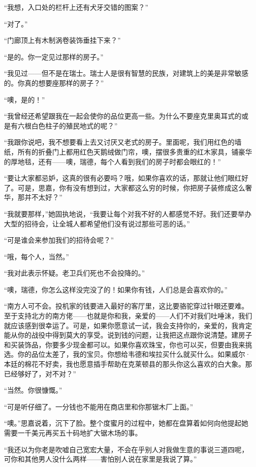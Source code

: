\par “我想，入口处的栏杆上还有犬牙交错的图案？”
\par “对了。”
\par “门廊顶上有木制涡卷装饰垂挂下来？”
\par “是的。你一定见过那样的房子。”
\par “我见过——但不是在瑞士。瑞士人是很有智慧的民族，对建筑上的美是非常敏感的。你真的想要座那样的房子？”
\par “噢，是的！”
\par “我曾经还希望跟我在一起会使你的品位更高一些。为什么不要座克里奥耳式的或是有六根白色柱子的殖民地式的呢？”
\par “我跟你说吧，我不想要看上去又讨厌又老式的房子。里面呢，我们用红色的墙纸，所有的折叠门上都用红色天鹅绒做门帘，噢，摆很多贵重的红木家具，铺豪华的厚地毯，还有——噢，瑞德，每个人看到我们的房子时都会眼红的！”
\par “要让大家都忌妒，这真的很有必要吗？哦，如果你喜欢的话，那就让他们眼红好了。可是，思嘉，你有没有想到过，大家都这么穷的时候，你把房子装修成这么奢华，那并不太好？”
\par “我就要那样，”她固执地说，“我要让每个对我不好的人都感觉不好。我们还要举办大型的招待会，让全城人都希望他们没有说过那些可恶的话。”
\par “可是谁会来参加我们的招待会呢？”
\par “哦，每个人，当然。”
\par “我对此表示怀疑。老卫兵们死也不会投降的。”
\par “噢，瑞德，你怎么这样没完没了的！如果你有钱，人们总是会喜欢你的。”
\par “南方人可不会。投机家的钱要进入最好的客厅里，这比要骆驼穿过针眼还要难。至于支持北方的南方佬——也就是你和我，亲爱的——人们不对我们吐唾沫，我们就应该感到很幸运了。可是，如果你愿意试一试，我会支持你的，亲爱的，我肯定能从你的战役中得到莫大的享受。说到钱的问题，让我把这点跟你说清楚。建房子和买装饰品，你要多少现金都可以。如果你喜欢珠宝，你也可以买，但要由我来挑选。你的品位太差了，我的宝贝。你想给韦德和埃拉买什么就买什么。如果威尔·本廷的棉花不好卖，我也愿意插手帮助在克莱顿县的那头你这么喜欢的白大象。那已经够好了，对不对？”
\par “当然。你很慷慨。”
\par “可是听仔细了。一分钱也不能用在商店里和你那锯木厂上面。”
\par “噢。”思嘉说着，沉下了脸。整个度蜜月的过程中，她都在盘算着如何向他提起她需要一千美元再买五十码地扩大锯木场的事。
\par “我还以为你老是吹嘘自己宽宏大量，不会在乎别人对我做生意的事说三道四呢，可你和其他男人没什么两样——害怕别人说在家里是我说了算。”
